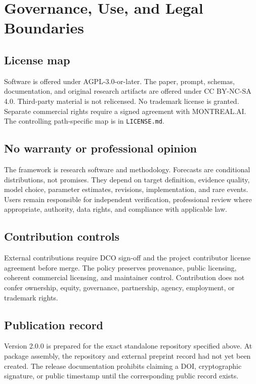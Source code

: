 
\section{Governance, Use, and Legal Boundaries}
\label{app:governance}

\subsection{License map}

Software is offered under AGPL-3.0-or-later. The paper, prompt, schemas, documentation, and original research artifacts are offered under CC BY-NC-SA 4.0. Third-party material is not relicensed. No trademark license is granted. Separate commercial rights require a signed agreement with MONTREAL.AI. The controlling path-specific map is in \texttt{LICENSE.md}.

\subsection{No warranty or professional opinion}

The framework is research software and methodology. Forecasts are conditional distributions, not promises. They depend on target definition, evidence quality, model choice, parameter estimates, revisions, implementation, and rare events. Users remain responsible for independent verification, professional review where appropriate, authority, data rights, and compliance with applicable law.

\subsection{Contribution controls}

External contributions require DCO sign-off and the project contributor license agreement before merge. The policy preserves provenance, public licensing, coherent commercial licensing, and maintainer control. Contribution does not confer ownership, equity, governance, partnership, agency, employment, or trademark rights.

\subsection{Publication record}

Version 2.0.0 is prepared for the exact standalone repository specified above. At package assembly, the repository and external preprint record had not yet been created. The release documentation prohibits claiming a DOI, cryptographic signature, or public timestamp until the corresponding public record exists.
